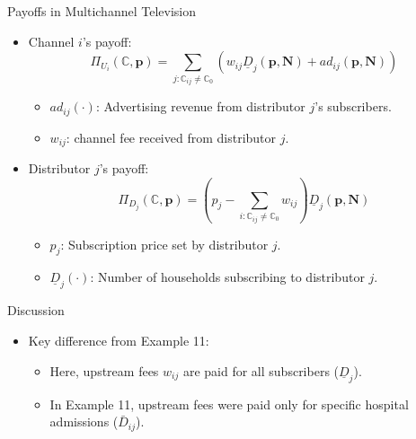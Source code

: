 \documentclass[aspectratio=169]{beamer}  %
\begin{document}
\begin{frame}{Payoffs in Multichannel Television}
    \begin{itemize}
        \item Channel \(i\)'s payoff:
        \[
        \Pi_{U_i}(\mathbb{C}, \boldsymbol{p}) = \sum_{j : \mathbb{C}_{ij} \neq \mathbb{C}_0} \left(w_{ij} \underline{D}_j(\boldsymbol{p}, \boldsymbol{N}) + ad_{ij}(\boldsymbol{p}, \boldsymbol{N})\right)
        \]
        \begin{itemize}
            \item \(ad_{ij}(\cdot)\): Advertising revenue from distributor \(j\)'s subscribers.
            \item $w_{ij}$: channel fee received from distributor $j$.
        \end{itemize}

        \item Distributor \(j\)'s payoff:
        \[
        \Pi_{D_j}(\mathbb{C}, \boldsymbol{p}) = \left(p_j - \sum_{i : \mathbb{C}_{ij} \neq \mathbb{C}_0} w_{ij}\right) \underline{D}_j(\boldsymbol{p}, \boldsymbol{N})
        \]
        \begin{itemize}
            \item \(p_j\): Subscription price set by distributor \(j\).
            \item \(\underline{D}_j(\cdot)\): Number of households subscribing to distributor \(j\).
        \end{itemize}

    \end{itemize}
\end{frame}

\begin{frame}{Discussion}
    \begin{itemize}
            \item Key difference from Example 11:
        \begin{itemize}
            \item Here, upstream fees \(w_{ij}\) are paid for all subscribers (\(\underline{D}_j\)).
            \item In Example 11, upstream fees were paid only for specific hospital admissions (\(\bar{D}_{ij}\)).
        \end{itemize}
    \end{itemize}
\end{frame}
\end{document}
